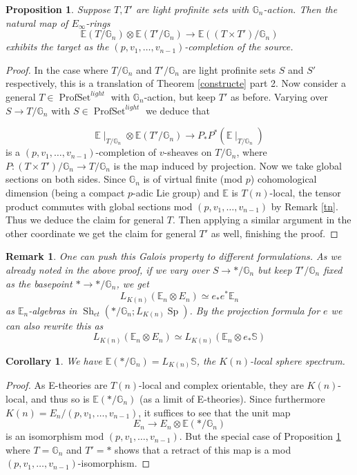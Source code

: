 \documentclass[12pt]{article}
\newtheorem{proposition}[theorem]{Proposition}
\newtheorem{corollary}[theorem]{Corollary}
\newtheorem{remark}[theorem]{Remark}
\newcommand{\on}{\operatorname}
\newcommand{\mbb}{\mathbb}
\begin{document}
\begin{proposition}\label{galoiskunneth}
Suppose $T,T'$ are light profinite sets with $\mathbb{G}_n$-action.  Then the natural map of $E_\infty$-rings
$$\mathbb{E}(T/\mathbb{G}_n)\otimes \mathbb{E}(T'/\mathbb{G}_n) \to \mathbb{E}((T\times T')/\mathbb{G}_n)$$
exhibits the target as the $(p,v_1,\ldots,v_{n-1})$-completion of the source.
\end{proposition}
\begin{proof}
In the case where $T/\mathbb{G}_n$ and $T'/\mathbb{G}_n$ are light profinite sets $S$ and $S'$ respectively, this is a translation of Theorem \ref{constructe} part 2.   Now consider a general $T\in\on{ProfSet}^{light}$ with $\mathbb{G}_n$-action, but keep $T'$ as before.  Varying over $S\to T/\mathbb{G}_n$ with $S\in\on{ProfSet}^{light}$ we deduce that

$$\mathbb{E}\mid_{T/\mathbb{G}_n} \otimes \mathbb{E}(T'/\mathbb{G}_n) \to P_\ast P^\ast (\mathbb{E}\mid_{T/\mathbb{G}_n})$$
is a $(p,v_1,\ldots,v_{n-1})$-completion of $v$-sheaves on $T/\mathbb{G}_n$, where $P:(T\times T')/\mathbb{G}_n \to T/\mathbb{G}_n$ is the map induced by projection.  Now we take global sections on both sides.  Since $\mathbb{G}_n$ is of virtual finite (mod $p$) cohomological dimension (being a compact $p$-adic Lie group) and $\mathbb{E}$ is $T(n)$-local, the tensor product commutes with global sections mod $(p,v_1,\ldots,v_{n-1})$ by Remark \ref{tn}.  Thus we deduce the claim for general $T$.  Then applying a similar argument in the other coordinate we get the claim for general $T'$ as well, finishing the proof.\end{proof}

\begin{remark}\label{differentgalois}
One can push this Galois property to different formulations.  As we already noted in the above proof, if we vary over $S\to \ast/\mbb{G}_n$ but keep $T'/\mbb{G}_n$ fixed as the basepoint $\ast \to \ast/\mbb{G}_n$, we get
$$L_{K(n)}(\mbb{E}_n\otimes E_n)\simeq e_\ast e^\ast \mbb{E}_n$$
as $\mbb{E}_n$-algebras in $\on{Sh}_{et}(\ast/\mbb{G}_n;L_{K(n)}\on{Sp})$.  By the projection formula for $e$ we can also rewrite this as
$$L_{K(n)}(\mbb{E}_n\otimes E_n)\simeq L_{K(n)}(\mbb{E}_n\otimes e_\ast\mbb{S})$$
\end{remark}

\begin{corollary}\label{globalsec}
We have $\mathbb{E}(\ast/\mathbb{G}_n)=L_{K(n)}\mathbb{S}$, the $K(n)$-local sphere spectrum.
\end{corollary}
\begin{proof}
As E-theories are $T(n)$-local and complex orientable, they are $K(n)$-local, and thus so is $\mathbb{E}(\ast/\mathbb{G}_n)$ (as a limit of E-theories).  Since furthermore $K(n)=E_n/(p,v_1,\ldots,v_{n-1})$, it suffices to see that the unit map
$$E_n \to E_n\otimes \mathbb{E}(\ast/\mathbb{G}_n)$$
is an isomorphism mod $(p,v_1,\ldots,v_{n-1})$.  But the special case of Proposition \ref{galoiskunneth} where $T=\mathbb{G}_n$ and $T'=\ast$ shows that a retract of this map is a mod $(p,v_1,\ldots,v_{n-1})$-isomorphism.
\end{proof}
\end{document}
